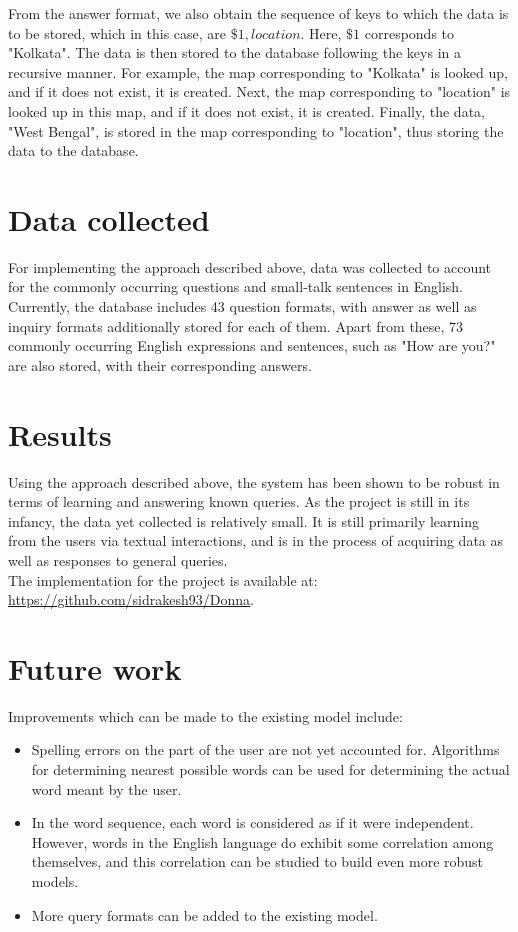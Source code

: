 \documentclass[12pt,a4paper]{article}
\begin{document}
From the answer format, we also obtain the sequence of keys to which the data is to be stored, which in this case, are $\$1,location$. Here, $\$1$ corresponds to "Kolkata". The data is then stored to the database following the keys in a recursive manner. For example, the map corresponding to "Kolkata" is looked up, and if it does not exist, it is created. Next, the map corresponding to "location" is looked up in this map, and if it does not exist, it is created. Finally, the data, "West Bengal", is stored in the map corresponding to "location", thus storing the data to the database.

\section{Data collected}

For implementing the approach described above, data was collected to account for the commonly occurring questions and small-talk sentences in English.\\

Currently, the database includes 43 question formats, with answer as well as inquiry formats additionally stored for each of them. Apart from these, 73 commonly occurring English expressions and sentences, such as "How are you?" are also stored, with their corresponding answers.

\section{Results}

Using the approach described above, the system has been shown to be robust in terms of learning and answering known queries. As the project is still in its infancy, the data yet collected is relatively small. It is still primarily learning from the users via textual interactions, and is in the process of acquiring data as well as responses to general queries.\\

The implementation for the project is available at: \url{https://github.com/sidrakesh93/Donna}.

\section{Future work}

Improvements which can be made to the existing model include:

\begin{itemize}
\item Spelling errors on the part of the user are not yet accounted for. Algorithms for determining nearest possible words can be used for determining the actual word meant by the user.

\item In the word sequence, each word is considered as if it were independent. However, words in the English language do exhibit some correlation among themselves, and this correlation can be studied to build even more robust models.

\item More query formats can be added to the existing model.
\end{itemize}
\end{document}
